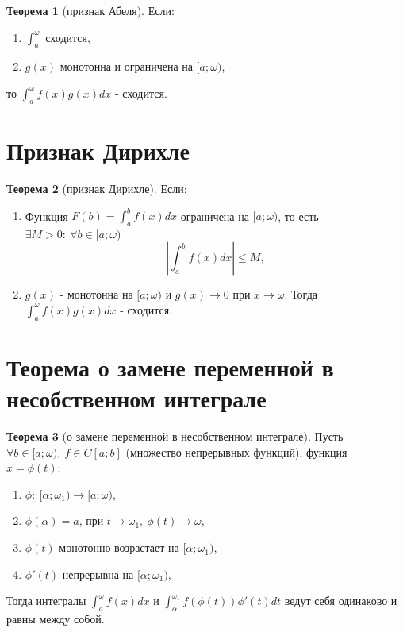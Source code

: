 \documentclass{report}
\theoremstyle{definition}
\newtheorem*{theorem}{Теорема}
\begin{document}
\begin{theorem}[признак Абеля]
    Если:
    \begin{enumerate}
        \item $\int_{a}^{\omega}$ сходится,
        \item $g(x)$ монотонна и ограничена на $[a;\omega)$,
    \end{enumerate}
    то $\int_{a}^{\omega} f(x)g(x)dx$ - сходится.
\end{theorem}

\section{Признак Дирихле}

\begin{theorem}[признак Дирихле]
    Если:
    \begin{enumerate}
        \item Функция $F(b) = \int_{a}^{b}f(x)dx$ ограничена на $[a;\omega)$, то есть $\exists M > 0: \
                  \forall b \in[a;\omega)$
              \begin{equation*}
                  | \int_{a}^{b}f(x)dx | \leqslant M,
              \end{equation*}
        \item $g(x)$ - монотонна на $[a;\omega)$ и $g(x)\rightarrow 0$ при $x\rightarrow\omega$.
              Тогда $\int_{a}^{\omega}f(x)g(x)dx$ - сходится.
    \end{enumerate}
\end{theorem}

\section{Теорема о замене переменной в несобственном интеграле}

\begin{theorem}[о замене переменной в несобственном интеграле]
    Пусть $\forall b \in [a;\omega), \ f \in C[a;b]$ (множество непрерывных функций), функция $x = \phi(t):$
    \begin{enumerate}
        \item $\phi: \ [\alpha;\omega_1) \rightarrow [a;\omega)$,
        \item $\phi(\alpha) = a$, при $t \rightarrow \omega_1, \ \phi(t) \rightarrow \omega$,
        \item $\phi(t)$ монотонно возрастает на $[\alpha;\omega_1)$,
        \item $\phi'(t)$ непрерывна на $[\alpha;\omega_1)$,
    \end{enumerate}
    Тогда интегралы $\int_{a}^{\omega}f(x)dx$ и $\int_{\alpha}^{\omega_1}f(\phi(t))\phi'(t)dt$ ведут себя
    одинаково и равны между собой.
\end{theorem}
\end{document}

